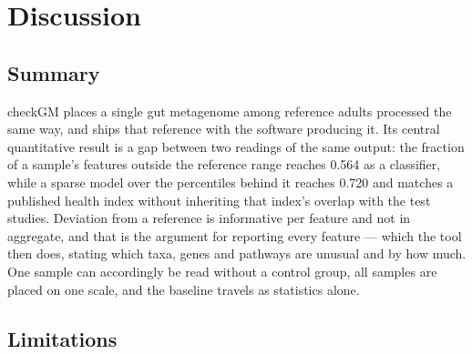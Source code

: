 \documentclass[conference]{IEEEtran}
\begin{document}
\section{Discussion}

\subsection{Summary}

checkGM places a single gut metagenome among reference adults processed the same way, and ships that reference with the software producing it. Its central quantitative result is a gap between two readings of the same output: the fraction of a sample's features outside the reference range reaches 0.564 as a classifier, while a sparse model over the percentiles behind it reaches 0.720 and matches a published health index without inheriting that index's overlap with the test studies. Deviation from a reference is informative per feature and not in aggregate, and that is the argument for reporting every feature --- which the tool then does, stating which taxa, genes and pathways are unusual and by how much. One sample can accordingly be read without a control group, all samples are placed on one scale, and the baseline travels as statistics alone.

\subsection{Limitations}
\end{document}

